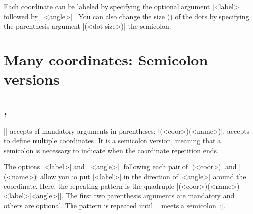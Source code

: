 Each coordinate can be labeled by specifying the optional argument |{<label>}| followed by |[<angle>]|. You can also change the size () of the dots by specifying the  parenthesis argument |(<dot size>)|  the semicolon.

\begin{tzcode}{.3}
\end{tzcode}


\section{Many coordinates: Semicolon versions}
\label{si:manycoordinates}

\subsection{\protect\cmd{\tzcoors}, \protect\cmd{\tzcoors*}}
\label{ssi:tzcoors}

|\tzcoor| accepts  of mandatory arguments in parentheses: |(<coor>)(<name>)|.
\icmd{\tzcoors} accepts  to define multiple coordinates. It is a semicolon version, meaning that a semicolon is necessary to indicate when the coordinate repetition ends.

\begin{tzcode}{.3}
\end{tzcode}

The options |{<label>}| and |[<angle>]| following each pair of |(<coor>)| and |(<name>)| allow you to put |<label>| in the direction of |<angle>| around the coordinate.
Here, the repeating pattern is the quadruple |(<coor>)(<name>){<label>}[<angle>]|. The first two parenthesis arguments are mandatory and others are optional. The pattern is repeated until |\tzcoors| meets a semicolon |;|.

\begin{tzcode}{.3}
\end{tzcode}


